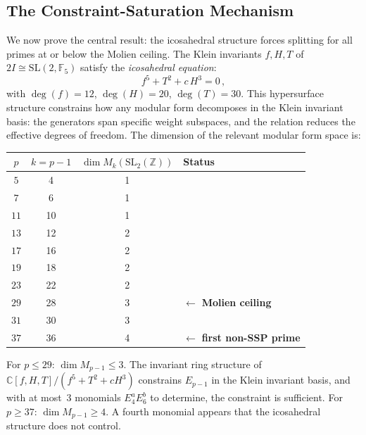 \documentclass[11pt,letterpaper]{article}
\theoremstyle{definition}
\newcommand{\ZZ}{\mathbb{Z}}
\newcommand{\FF}{\mathbb{F}}
\begin{document}
\subsection{The Constraint-Saturation Mechanism}\label{sec:constraints}
We now prove the central result: the icosahedral structure forces splitting for all primes at or below the Molien ceiling.
The Klein invariants $f,H,T$ of $2I\cong\mathrm{SL}(2,\FF_5)$ satisfy the \emph{icosahedral equation}:
\begin{equation}\label{eq:icosa-eqn}
  f^5 + T^2 + c\,H^3 = 0\,,
\end{equation}
with $\deg(f)=12$, $\deg(H)=20$, $\deg(T)=30$.  This hypersurface structure constrains how any modular form decomposes in the Klein invariant basis: the generators span specific weight subspaces, and the relation reduces the effective degrees of freedom.
The dimension of the relevant modular form space is:
\medskip
\begin{center}
\begin{tabular}{cccl}
\toprule
$p$ & $k=p-1$ & $\dim M_k(\mathrm{SL}_2(\ZZ))$ & Status \\
\midrule
$5$  &  4  & 1 & \\
$7$  &  6  & 1 & \\
$11$ & 10  & 1 & \\
$13$ & 12  & 2 & \\
$17$ & 16  & 2 & \\
$19$ & 18  & 2 & \\
$23$ & 22  & 2 & \\
$29$ & 28  & 3 & $\longleftarrow$ \textbf{Molien ceiling} \\
$31$ & 30  & 3 & \\
$37$ & 36  & 4 & $\longleftarrow$ \textbf{first non-SSP prime} \\
\bottomrule
\end{tabular}
\end{center}
\medskip
For $p\le 29$: $\dim M_{p-1}\le 3$.  The invariant ring structure of $\mathbb{C}[f,H,T]/(f^5{+}T^2{+}cH^3)$ constrains $E_{p-1}$ in the Klein invariant basis, and with at most~3 monomials $E_4^aE_6^b$ to determine, the constraint is sufficient.  For $p\ge 37$: $\dim M_{p-1}\ge 4$.  A fourth monomial appears that the icosahedral structure does not control.
\end{document}
